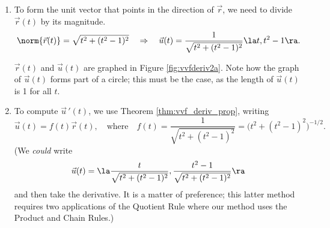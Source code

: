 {\begin{enumerate}
	\item To form the unit vector that points in the direction of $\vec r$, we need to divide $\vec r(t)$ by its magnitude. 
	$$\norm{\vec r(t)} = \sqrt{t^2+(t^2-1)^2} \quad \Rightarrow \quad \vec u(t) = \frac{1}{\sqrt{t^2+(t^2-1)^2}}\la t,t^2-1\ra.$$
	
	$\vec r(t)$ and $\vec u(t)$ are graphed in Figure \ref{fig:vvfderiv2a}. Note how the graph of $\vec u(t)$ forms part of a circle; this must be the case, as the length of $\vec u(t)$ is 1 for all $t$.
	
	\item		To compute $\vec u\,'(t)$, we use Theorem \ref{thm:vvf_deriv_prop}, writing $$\vec u(t) = f(t)\vec r(t),\quad  \text{where}\quad f(t) = \frac{1}{\sqrt{t^2+(t^2-1)^2}}=\big(t^2+(t^2-1)^2\big)^{-1/2}.$$ (We \emph{could} write $$\vec u(t) = \la \frac{t}{\sqrt{t^2+(t^2-1)^2}}, \frac{t^2-1}{\sqrt{t^2+(t^2-1)^2}}\ra$$ and then take the derivative. It is a matter of preference; this latter method requires two applications of the Quotient Rule where our method uses the Product and Chain Rules.)
	

\end{enumerate}}
